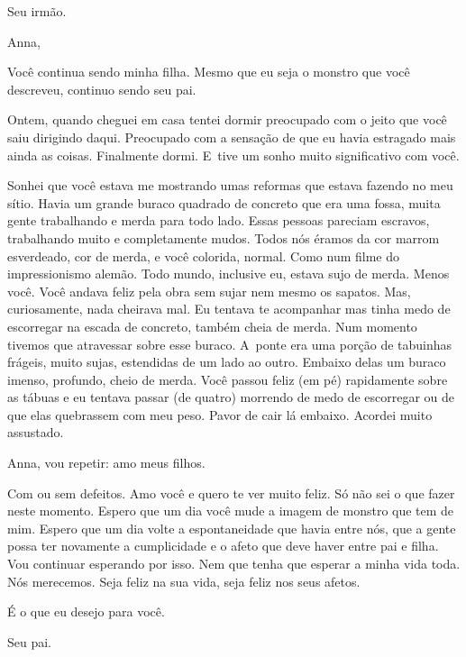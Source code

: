  \begin{flushright}Seu irmão.\end{flushright}


\asterisc{}

Anna,

\medskip{} 

Você continua sendo minha filha. Mesmo que eu seja o monstro que você
descreveu, continuo sendo seu pai.

Ontem, quando cheguei em casa tentei dormir preocupado com o jeito que
você saiu dirigindo daqui. Preocupado com a sensação de que eu havia
estragado mais ainda as coisas. Finalmente dormi. E~tive um sonho muito
significativo com você.

Sonhei que você estava me mostrando umas reformas que estava fazendo no
meu sítio. Havia um grande buraco quadrado de concreto que era uma
fossa, muita gente trabalhando e merda para todo lado. Essas pessoas
pareciam escravos, trabalhando muito e completamente mudos. Todos nós
éramos da cor marrom esverdeado, cor de merda, e você colorida, normal.
Como num filme do impressionismo alemão. Todo mundo, inclusive eu,
estava sujo de merda. Menos você. Você andava feliz pela obra sem sujar
nem mesmo os sapatos. Mas, curiosamente, nada cheirava mal. Eu tentava
te acompanhar mas tinha medo de escorregar na escada de concreto, também
cheia de merda. Num momento tivemos que atravessar sobre esse buraco. A~ponte era uma porção de tabuinhas frágeis, muito sujas, estendidas de um
lado ao outro. Embaixo delas um buraco imenso, profundo, cheio de merda.
Você passou feliz (em pé) rapidamente sobre as tábuas e eu tentava
passar (de quatro) morrendo de medo de escorregar ou de que elas
quebrassem com meu peso. Pavor de cair lá embaixo. Acordei muito
assustado.

Anna, vou repetir: amo meus filhos.

Com ou sem defeitos. Amo você e quero te ver muito feliz. Só não sei o
que fazer neste momento. Espero que um dia você mude a imagem de monstro
que tem de mim. Espero que um dia volte a espontaneidade que havia entre
nós, que a gente possa ter novamente a cumplicidade e o afeto que deve
haver entre pai e filha. Vou continuar esperando por isso. Nem que tenha
que esperar a minha vida toda. Nós merecemos. Seja feliz na sua vida,
seja feliz nos seus afetos.

É o que eu desejo para você.

\medskip{}  \begin{flushright}Seu pai.\end{flushright}


